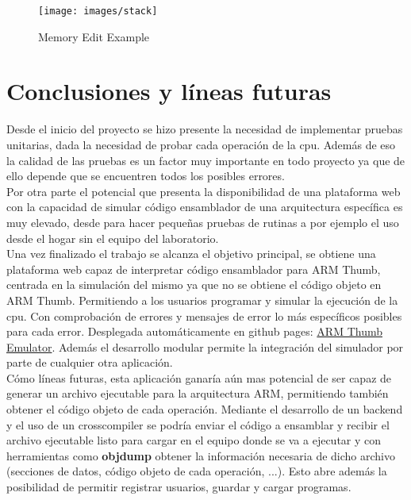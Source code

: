 {{            %


            \begin{figure}[h]
                \centering
                \texttt{[image: images/stack]}
                \caption{Memory Edit Example}
            \end{figure}
        }
    }

\section{Conclusiones y líneas futuras}
{
    Desde el inicio del proyecto se hizo presente la necesidad de implementar pruebas unitarias,
    dada la necesidad de probar cada operación de la cpu. Además de eso la calidad de las pruebas es un factor
    muy importante en todo proyecto ya que de ello depende que se encuentren todos los posibles errores. \\

    Por otra parte el potencial que presenta la disponibilidad de una plataforma web con la capacidad
    de simular código ensamblador de una arquitectura específica es muy elevado, desde para hacer
    pequeñas pruebas de rutinas a por ejemplo el uso desde el hogar sin el equipo del laboratorio. \\

    Una vez finalizado el trabajo se alcanza el objetivo principal, se obtiene una plataforma web
    capaz de interpretar código ensamblador para ARM Thumb, centrada en la simulación del mismo ya que no se obtiene
    el código objeto en ARM Thumb. Permitiendo a los usuarios
    programar y simular la ejecución de la cpu. Con comprobación de errores y mensajes de error lo más
    específicos posibles para cada error. Desplegada automáticamente en github pages: \href{https://freddyjs.github.io/wthumb/}{ARM Thumb Emulator}. Además el desarrollo modular permite la integración del simulador
    por parte de cualquier otra aplicación. \\

    Cómo líneas futuras, esta aplicación ganaría aún mas potencial de ser capaz de generar un archivo
    ejecutable para la arquitectura ARM, permitiendo también obtener el código objeto de cada operación. Mediante el desarrollo de un backend y el uso de un crosscompiler
    se podría enviar el código a ensamblar y recibir el archivo ejecutable listo para cargar en el equipo donde se
    va a ejecutar y con herramientas como \textbf{objdump} obtener la información necesaria de dicho archivo (secciones de datos, código objeto de cada operación, ...).
    Esto abre además la posibilidad de permitir registrar usuarios, guardar y cargar programas.  
}

